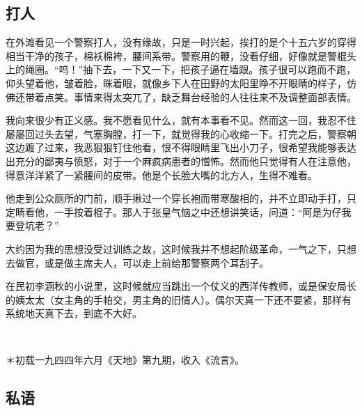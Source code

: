 \subsection{打人}

\par 在外滩看见一个警察打人，没有缘故，只是一时兴起，挨打的是个十五六岁的穿得相当干净的孩子，棉袄棉袴，腰间系带。警察用的鞭，没看仔细，好像就是警棍头上的绳圈。“呜！”抽下去，一下又一下，把孩子逼在墙跟。孩子很可以跑而不跑，仰头望着他，皱着脸，眯着眼，就像乡下人在田野的太阳里睁不开眼睛的样子，仿佛还带着点笑。事情来得太突兀了，缺乏舞台经验的人往往来不及调整面部表情。
\par 我向来很少有正义感。我不愿看见什么，就有本事看不见。然而这一回，我忍不住屡屡回过头去望，气塞胸膛，打一下，就觉得我的心收缩一下。打完之后，警察朝这边踱了过来，我恶狠狠钉住他看，恨不得眼睛里飞出小刀子，很希望我能够表达出充分的鄙夷与愤怒，对于一个麻疯病患者的憎怖。然而他只觉得有人在注意他，得意洋洋紧了一紧腰间的皮带。他是个长脸大嘴的北方人，生得不难看。
\par 他走到公众厕所的门前，顺手揪过一个穿长袍而带寒酸相的，并不立即动手打，只定睛看他，一手按着棍子。那人于张皇气恼之中还想讲笑话，问道：“阿是为仔我要登坑老？”
\par 大约因为我的思想没受过训练之故，这时候我并不想起阶级革命，一气之下，只想去做官，或是做主席夫人，可以走上前给那警察两个耳刮子。
\par 在民初李涵秋的小说里，这时候就应当跳出一个仗义的西洋传教师，或是保安局长的姨太太（女主角的手帕交，男主角的旧情人）。偶尔天真一下还不要紧，那样有系统地天真下去，到底不大好。
\par  
\par ＊初载一九四四年六月《天地》第九期，收入《流言》。


\subsection{私语}

